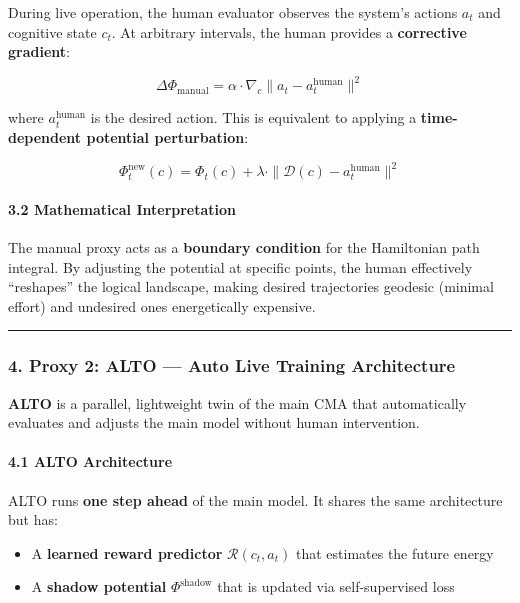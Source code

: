 \documentclass[
  11pt,
  a4paper,
]{article}
\providecommand{\tightlist}{%
  \setlength{\itemsep}{0pt}\setlength{\parskip}{0pt}}
\begin{document}
During live operation, the human evaluator observes the system's actions
\(a_t\) and cognitive state \(c_t\). At arbitrary intervals, the human
provides a \textbf{corrective gradient}:

\[\Delta \Phi_{\text{manual}} = \alpha \cdot \nabla_c \|a_t - a_t^{\text{human}}\|^2\]

where \(a_t^{\text{human}}\) is the desired action. This is equivalent
to applying a \textbf{time-dependent potential perturbation}:

\[\Phi_t^{\text{new}}(c) = \Phi_t(c) + \lambda \cdot \| \mathcal{D}(c) - a_t^{\text{human}} \|^2\]

\paragraph{3.2 Mathematical
Interpretation}\label{mathematical-interpretation}

The manual proxy acts as a \textbf{boundary condition} for the
Hamiltonian path integral. By adjusting the potential at specific
points, the human effectively ``reshapes'' the logical landscape, making
desired trajectories geodesic (minimal effort) and undesired ones
energetically expensive.

\begin{center}\rule{0.5\linewidth}{0.5pt}\end{center}

\subsubsection{4. Proxy 2: ALTO --- Auto Live Training
Architecture}\label{proxy-2-alto-auto-live-training-architecture}

\textbf{ALTO} is a parallel, lightweight twin of the main CMA that
automatically evaluates and adjusts the main model without human
intervention.

\paragraph{4.1 ALTO Architecture}\label{alto-architecture}

ALTO runs \textbf{one step ahead} of the main model. It shares the same
architecture but has:

\begin{itemize}
\tightlist
\item
  A \textbf{learned reward predictor} \(\mathcal{R}(c_t, a_t)\) that
  estimates the future energy
\item
  A \textbf{shadow potential} \(\Phi^{\text{shadow}}\) that is updated
  via self-supervised loss
\end{itemize}
\end{document}
